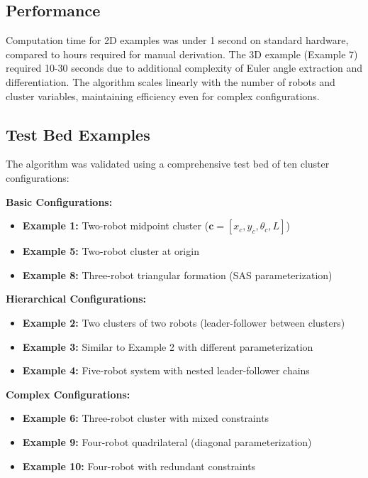 \documentclass[lettersize,journal]{IEEEtran}
\begin{document}
\subsection{Performance}

Computation time for 2D examples was under 1 second on standard hardware, compared to hours required for manual derivation. The 3D example (Example 7) required 10-30 seconds due to additional complexity of Euler angle extraction and differentiation. The algorithm scales linearly with the number of robots and cluster variables, maintaining efficiency even for complex configurations.

\subsection{Test Bed Examples}

The algorithm was validated using a comprehensive test bed of ten cluster configurations:

\textbf{Basic Configurations:}
\begin{itemize}
\item \textbf{Example 1:} Two-robot midpoint cluster ($\mathbf{c} = [x_c, y_c, \theta_c, L]$)
\item \textbf{Example 5:} Two-robot cluster at origin
\item \textbf{Example 8:} Three-robot triangular formation (SAS parameterization)
\end{itemize}

\textbf{Hierarchical Configurations:}
\begin{itemize}
\item \textbf{Example 2:} Two clusters of two robots (leader-follower between clusters)
\item \textbf{Example 3:} Similar to Example 2 with different parameterization
\item \textbf{Example 4:} Five-robot system with nested leader-follower chains
\end{itemize}

\textbf{Complex Configurations:}
\begin{itemize}
\item \textbf{Example 6:} Three-robot cluster with mixed constraints
\item \textbf{Example 9:} Four-robot quadrilateral (diagonal parameterization)
\item \textbf{Example 10:} Four-robot with redundant constraints
\end{itemize}
\end{document}
